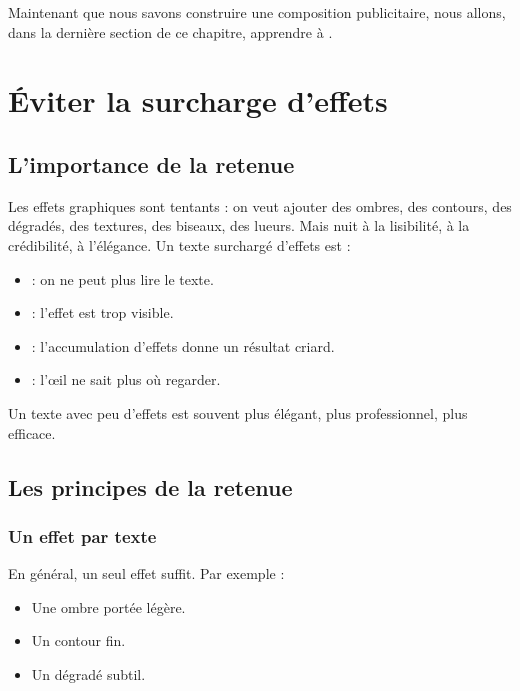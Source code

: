 Maintenant que nous savons construire une composition publicitaire, nous allons, dans la dernière section de ce chapitre, apprendre à .

\section{Éviter la surcharge d'effets}

\subsection{L'importance de la retenue}

Les effets graphiques sont tentants : on veut ajouter des ombres, des contours, des dégradés, des textures, des biseaux, des lueurs. Mais  nuit à la lisibilité, à la crédibilité, à l'élégance. Un texte surchargé d'effets est :

\begin{itemize}
    \item {} : on ne peut plus lire le texte.
    \item {} : l'effet est trop visible.
    \item {} : l'accumulation d'effets donne un résultat criard.
    \item {} : l'œil ne sait plus où regarder.
\end{itemize}

Un texte avec peu d'effets est souvent plus élégant, plus professionnel, plus efficace.

\subsection{Les principes de la retenue}

\subsubsection{Un effet par texte}

En général, un seul effet suffit. Par exemple :

\begin{itemize}
    \item Une ombre portée légère.
    \item Un contour fin.
    \item Un dégradé subtil.
\end{itemize}

